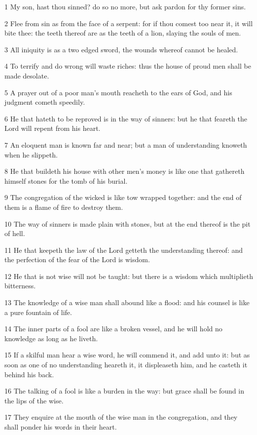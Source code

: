 \par 1 My son, hast thou sinned? do so no more, but ask pardon for thy former sins.
\par 2 Flee from sin as from the face of a serpent: for if thou comest too near it, it will bite thee: the teeth thereof are as the teeth of a lion, slaying the souls of men.
\par 3 All iniquity is as a two edged sword, the wounds whereof cannot be healed.
\par 4 To terrify and do wrong will waste riches: thus the house of proud men shall be made desolate.
\par 5 A prayer out of a poor man's mouth reacheth to the ears of God, and his judgment cometh speedily.
\par 6 He that hateth to be reproved is in the way of sinners: but he that feareth the Lord will repent from his heart.
\par 7 An eloquent man is known far and near; but a man of understanding knoweth when he slippeth.
\par 8 He that buildeth his house with other men's money is like one that gathereth himself stones for the tomb of his burial.
\par 9 The congregation of the wicked is like tow wrapped together: and the end of them is a flame of fire to destroy them.
\par 10 The way of sinners is made plain with stones, but at the end thereof is the pit of hell.
\par 11 He that keepeth the law of the Lord getteth the understanding thereof: and the perfection of the fear of the Lord is wisdom.
\par 12 He that is not wise will not be taught: but there is a wisdom which multiplieth bitterness.
\par 13 The knowledge of a wise man shall abound like a flood: and his counsel is like a pure fountain of life.
\par 14 The inner parts of a fool are like a broken vessel, and he will hold no knowledge as long as he liveth.
\par 15 If a skilful man hear a wise word, he will commend it, and add unto it: but as soon as one of no understanding heareth it, it displeaseth him, and he casteth it behind his back.
\par 16 The talking of a fool is like a burden in the way: but grace shall be found in the lips of the wise.
\par 17 They enquire at the mouth of the wise man in the congregation, and they shall ponder his words in their heart.
